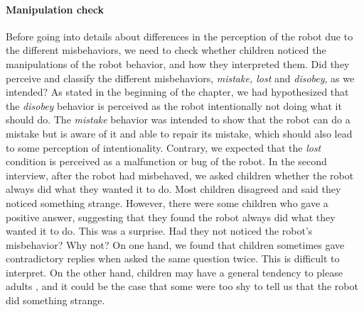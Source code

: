 \documentclass{sig-alternate}
\begin{document}
\paragraph{Manipulation check} 

Before going into details about differences in the perception of the robot due
to the different misbehaviors, we need to check whether children noticed the
manipulations of the robot behavior, and how they interpreted them. Did they
perceive and classify the different misbehaviors, \textit{mistake, lost} and
\textit{disobey}, as we intended?  As stated in the beginning of the chapter, we
had hypothesized that the \textit{disobey} behavior is perceived as the robot
intentionally not doing what it should do. The \textit{mistake} behavior was
intended to show that the robot can do a mistake but is aware of it and able to
repair its mistake, which should also lead to some perception of intentionality.
Contrary, we expected that the \textit{lost} condition is perceived as a
malfunction or bug of the robot.  In the second interview, after the robot had
misbehaved, we asked children whether the robot always did what they wanted it
to do. Most children disagreed and said they noticed something strange. However,
there were some children who gave a positive answer, suggesting that they found
the robot always did what they wanted it to do. This was a surprise. Had they
not noticed the robot's misbehavior? Why not? On one hand, we found that
children sometimes gave contradictory replies when asked the same question
twice. This is difficult to interpret. On the other hand, children may have a
general tendency to please adults \cite{leite_long-term_2013}, and it could be
the case that some were too shy to tell us that the robot did something strange.

\end{document}
